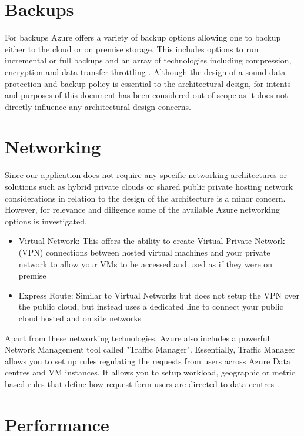 \section{Backups}

For backups Azure offers a variety of backup options allowing one to backup either to the cloud or on premise storage. This includes options to run incremental or full backups and an array of technologies including compression, encryption and data transfer throttling \cite{Microsoft_Corporation_undated-ej}.  Although the design of a sound data protection and backup policy is essential to the architectural design, for intents and purposes of this document has been considered out of scope as it does not directly influence any architectural design concerns. 

\section{Networking}

Since our application does not require any specific networking architectures or solutions such as hybrid private clouds or shared public private hosting network considerations in relation to the design of the architecture is a minor concern. However, for relevance and diligence some of the available Azure networking options is investigated.
 
\begin{itemize}
\item Virtual Network: This offers the ability to create Virtual Private Network (VPN) connections between hosted virtual machines and your private network to allow your VMs to be accessed and used as if they were on premise
\item Express Route: Similar to Virtual Networks but does not setup the VPN over the public cloud, but instead uses a dedicated line to connect your public cloud hosted and on site networks
\end{itemize}

Apart from these networking technologies, Azure also includes a powerful Network Management tool called "Traffic Manager". Essentially, Traffic Manager allows you to set up rules regulating the requests from users across Azure Data centres and VM instances. It allows you to setup workload, geographic or metric based rules that define how request form users are directed to data centres \cite{Microsoft_Corporation_undated-ej}.

\section{Performance}
